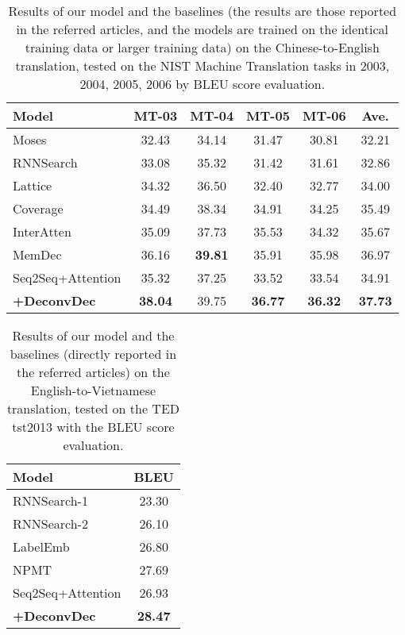 \documentclass[11pt]{article}
\begin{document}
\begin{CJK}{UTF8}{gbsn}
\begin{table*}[tb]
\centering
    \begin{tabular}{l|c|c|c|c|c}
    \hline
    Model  & MT-03 & MT-04 & MT-05 & MT-06 & Ave.\\ \hline\hline
    Moses  & 32.43 & 34.14 & 31.47 & 30.81 & 32.21        \\ 
RNNSearch  & 33.08 & 35.32 & 31.42 & 31.61 & 32.86        \\ 
    Lattice   &  34.32 &  36.50 &  32.40 & 32.77  &  34.00  \\
    Coverage  & 34.49 & 38.34 & 34.91 & 34.25 & 35.49 \\
    InterAtten  & 35.09 & 37.73 & 35.53 & 34.32 & 35.67 \\
    MemDec  & 36.16 & \textbf{39.81} & 35.91 & 35.98 & 36.97 \\
\hline\hline
     Seq2Seq+Attention & 35.32  & 37.25 & 33.52  & 33.54  & 34.91 \\
    \textbf{+DeconvDec}  & \textbf{38.04}  & 39.75 & \textbf{36.77}  &  \textbf{36.32} & \textbf{37.73} \\
    \hline
    \end{tabular}
    \caption{Results of our model and the baselines (the results are those reported in the referred articles, and the models are trained on the identical training data or larger training data) on the Chinese-to-English translation, tested on the NIST Machine Translation tasks in 2003, 2004, 2005, 2006 by BLEU score evaluation.}
    \label{cnen}
\end{table*}

\begin{table}[tb]
\centering
    \begin{tabular}{l|c}
    \hline
    Model & BLEU  \\ \hline\hline
    RNNSearch-1  &    23.30          \\ 
    RNNSearch-2  &     26.10                 \\ 
    LabelEmb  &     26.80                 \\
    NPMT &   27.69               \\
\hline\hline
     Seq2Seq+Attention &  26.93 \\
\textbf{+DeconvDec} &  \textbf{28.47} \\
    \hline
    \end{tabular}
    \caption{Results of our model and the baselines (directly reported in the referred articles) on the English-to-Vietnamese translation, tested on the TED tst2013 with the BLEU score evaluation.}
    \label{envi}
\end{table}


\end{CJK}
\end{document}
